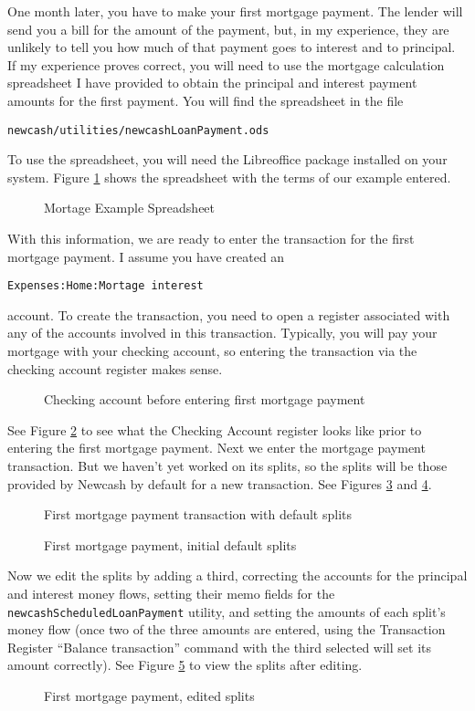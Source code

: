 \documentclass{report}
\newcommand{\graphicsfig}[5]{
\begin{figure}[#5]
\begin{center}
\resizebox{#1}{!}{\texttt{[image: \#2]}}
\end{center}
\caption{#3}
\label{#4}
\end{figure}
}
\begin{document}
One month later, you have to make your first mortgage payment. The lender will send you a bill for the amount of the payment, but, in my experience, they are unlikely to tell you how much of that payment goes to interest and to principal. If my experience proves correct, you will need to use the mortgage calculation spreadsheet I have provided to obtain the principal and interest payment amounts for the first payment. You will find  the spreadsheet in the file
\begin{verbatim}
newcash/utilities/newcashLoanPayment.ods
\end{verbatim}
To use the spreadsheet, you will need the Libreoffice package installed on your system. Figure \ref{Mortage Example Spreadsheet} shows the spreadsheet with the terms of our example entered.
\graphicsfig{5in}{figures/mortgage_example_spreadsheet.png}{Mortage Example Spreadsheet}{Mortage Example Spreadsheet}{}
With this information, we are ready to enter the transaction for the first mortgage payment. I assume you have created an
\begin{verbatim}
Expenses:Home:Mortage interest
\end{verbatim}
account. To create the transaction, you need to open a register associated with any of the accounts involved in this transaction. Typically, you will pay your mortgage with your checking account, so entering the transaction via the checking account register makes sense. 
\graphicsfig{5in}{figures/checking_account_before_first_mortgage_payment.png}{Checking account before entering first mortgage payment}{Checking account before entering first mortgage payment}{}
See Figure \ref{Checking account before entering first mortgage payment} to see what the Checking Account register looks like prior to entering the first mortgage payment. Next we enter the mortgage payment transaction. But we haven't yet worked on its splits, so the splits will be those provided by Newcash by default for a new transaction.  See Figures \ref{First mortgage payment transaction with default splits} and \ref{First mortgage payment, initial default splits}.
\graphicsfig{5in}{figures/first_mortgage_payment_transaction_default_splits.png}{First mortgage payment transaction with default splits}{First mortgage payment transaction with default splits}{}
\graphicsfig{5in}{figures/first_mortgage_payment_default_splits.png}{First mortgage payment, initial default splits}{First mortgage payment, initial default splits}{}
Now we edit the splits by adding a third, correcting the accounts for the principal and interest money flows, setting their memo fields for the \verb|newcashScheduledLoanPayment| utility, and setting the amounts of each split's money flow (once two of the three amounts are entered, using the Transaction Register ``Balance transaction'' command with the third selected will set its amount correctly). See Figure \ref{First mortgage payment, edited splits} to view the splits after editing.
\graphicsfig{5in}{figures/first_mortgage_payment_edited_splits.png}{First mortgage payment, edited splits}{First mortgage payment, edited splits}{}
\end{document}
